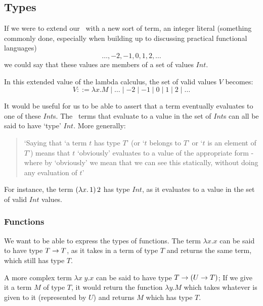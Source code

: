 \subsection{Types}
If we were to extend our \lcalc\ with a new sort of term, an integer literal (something commonly done, especially when building up to discussing practical functional languages) \[\dots, -2, -1, 0, 1, 2, \dots\] we could say that these values are members of a set of values $Int$. 

In this extended value of the lambda calculus, the set of valid values $V$ becomes:
\[V ::= \lambda x. M \mid \dots \mid -2\mid -1\mid 0\mid 1\mid 2\mid \dots \]

\noindent It would be useful for us to be able to assert that a term eventually evaluates to one of these $Int$s. The \lcalc\ terms that evaluate to a value in the set of $Int$s can all be said to have `type' $Int$. More generally: 
\begin{quote}
`Saying that `a term $t$ has type $T$' (or `$t$ belongs to $T$' or `$t$ is an element of $T$') means that $t$ `obviously' evaluates to a value of the appropriate form - where by `obviously' we mean that we can see this statically, without doing any evaluation of $t$' \cite{pierce2002types}
\end{quote}

\noindent For instance, the term \((\lambda x.\, 1)\, 2\) has type $Int$, as it evaluates to a value in the set of valid $Int$ values. 


\subsubsection{Functions}
We want to be able to express the types of functions. The term \(\lambda x. x\) can be said to have type \(T \rightarrow T\), as it takes in a term of type $T$ and returns the same term, which still has type $T$.

A more complex term \(\lambda x\;y.x\) can be said to have type \(T \rightarrow (U \rightarrow T)\); If we give it a term $M$ of type $T$, it would return the function \(\lambda y.M\) which takes whatever is given to it (represented by $U$) and returns $M$ which has type $T$. 

